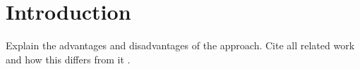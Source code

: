 \section{Introduction}

Explain the advantages and disadvantages of the approach. Cite all related work and how this differs from it \cite{artcodes} \cite{navilens}.
